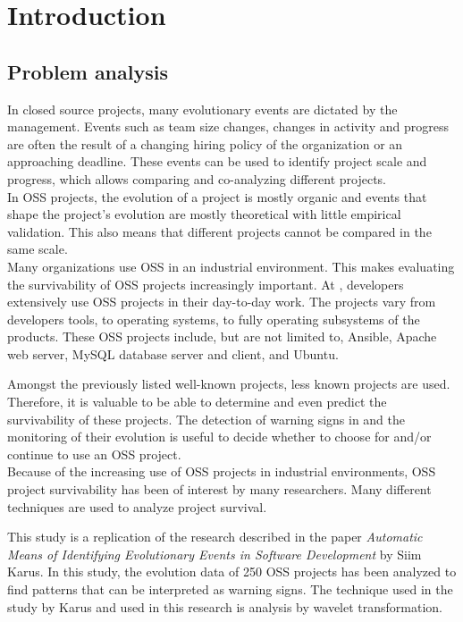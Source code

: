 \chapter{Introduction}

\section{Problem analysis}

In closed source projects, many evolutionary events are dictated by the
management.
Events such as team size changes, changes in activity and progress are often the
result of a changing hiring policy of the organization or an approaching
deadline. These events can be used to identify project scale and progress, which
allows comparing and co-analyzing different projects.\\

In OSS projects, the evolution of a project is mostly organic and events that
shape the project's evolution are mostly theoretical with little empirical
validation. This also means that different projects cannot be compared in the
same scale.\\

Many organizations use OSS in an industrial environment. This makes evaluating
the survivability of OSS projects increasingly important. At \theOrganization,
developers extensively use OSS projects in their day-to-day work. The projects
vary from developers tools, to operating systems, to fully operating subsystems
of the products. These OSS projects include, but are not limited to, Ansible,
Apache web server, MySQL database server and client, and Ubuntu.

Amongst the previously listed well-known projects, less known projects are used.
Therefore, it is valuable to be able to determine and even predict the
survivability of these projects. The detection of warning signs in and the
monitoring of their evolution is useful to decide whether to choose for and/or
continue to use an OSS project.\\

Because of the increasing use of OSS projects in industrial environments, OSS
project survivability has been of interest by many researchers. Many different
techniques are used to analyze project survival.

This study is a replication of the research described in the paper
\emph{Automatic Means of Identifying Evolutionary Events in Software
Development} by Siim Karus. In this study, the evolution data of 250 OSS
projects has been analyzed to find patterns that can be interpreted as warning
signs. The technique used in the study by Karus and used in this research is
analysis by wavelet transformation.

